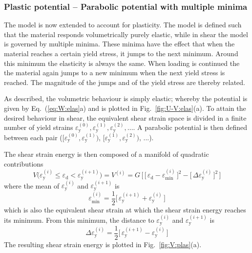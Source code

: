 \documentclass[times,namecite]{goose-article}
\begin{document}
\subsubsection{Plastic potential -- Parabolic potential with multiple minima}

The model is now extended to account for plasticity. The model is defined such that the material responds volumetrically purely elastic, while in shear the model is governed by multiple minima. These minima have the effect that when the material reaches a certain yield stress, it jumps to the next minimum. Around this minimum the elasticity is always the same. When loading is continued the the material again jumps to a new minimum when the next yield stress is reached. The magnitude of the jumps and of the yield stress are thereby related.

As described, the volumetric behaviour is simply elastic; whereby the potential is given by Eq.~(\ref{eq:W:elas}a) and is plotted in Fig.~\ref{fig:U-V:elas}(a). To attain the desired behaviour in shear, the equivalent shear strain space is divided in a finite number of yield strains $\varepsilon_\mathrm{y}^{(0)}, \varepsilon_\mathrm{y}^{(1)}, \varepsilon_\mathrm{y}^{(2)}, ...$. A parabolic potential is then defined between each pair ($[ \varepsilon_\mathrm{y}^{(0)}, \varepsilon_\mathrm{y}^{(1)} )$, $[ \varepsilon_\mathrm{y}^{(1)}, \varepsilon_\mathrm{y}^{(2)} )$, ...).

The shear strain energy is then composed of a manifold of quadratic contributions
\begin{equation}\label{eq:V-plas}
  V \big(
    \varepsilon_\mathrm{y}^{(i)} \leq \varepsilon_\mathrm{d} < \varepsilon_\mathrm{y}^{(i+1)}
  \big)
  =
  V^{(i)}
  =
  G \, \bigg[\,
    \Big[\, \varepsilon_\mathrm{d} - \varepsilon_\mathrm{min}^{(i)} \,\Big]^2
    -
    \Big[\, \Delta \varepsilon_\mathrm{y}^{(i)} \,\Big]^2
  \,\bigg]
\end{equation}
where the mean of $\varepsilon_\mathrm{y}^{(i)}$ and $\varepsilon_\mathrm{y}^{(i+1)}$ is
\begin{equation}
  \varepsilon_\mathrm{min}^{(i)}
  =
  \frac{1}{2} \Big[\, \varepsilon_\mathrm{y}^{(i+1)} + \varepsilon_\mathrm{y}^{(i)} \,\Big]
\end{equation}
which is also the equivalent shear strain at which the shear strain energy reaches its minimum. From this minimum, the distance to $\varepsilon_\mathrm{y}^{(i)}$ and $\varepsilon_\mathrm{y}^{(i+1)}$ is
\begin{equation}
  \Delta \varepsilon_\mathrm{y}^{(i)}
  =
  \frac{1}{2} \Big[\, \varepsilon_\mathrm{y}^{(i+1)} - \varepsilon_\mathrm{y}^{(i)} \,\Big]
\end{equation}
The resulting shear strain energy is plotted in Fig.~\ref{fig:V:plas}(a).
\end{document}
